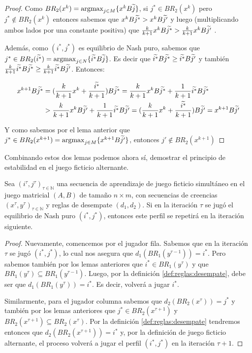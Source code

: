 \begin{proof}
    Como $BR_2(x^{k}) = \operatorname*{argmax}_{j \in M} \{x^k B \widetilde{j}\}$, si $j^* \in BR_2(x^k)$ pero $j^* \notin BR_2(x^k)$ entonces sabemos que $x^k B \widetilde{j^*} > x^k B \widetilde{j'}$ y luego (multiplicando ambos lados por una constante positiva) que $\frac{k}{k+1} x^k B \widetilde{j^*} > \frac{k}{k+1} x^k B \widetilde{j'}$ .

    Además, como $(i^*, j^*)$ es equilibrio de Nash puro, sabemos que $j^* \in BR_2(\widetilde{i^*}) = \operatorname*{argmax}_{j \in N} \{\widetilde{i^*}B\widetilde{j}\}$. Es decir que $\widetilde{i^*}B\widetilde{j^*} \ge \widetilde{i^*}B\widetilde{j'}$ y también $\frac{k}{k+1} \widetilde{i^*}B\widetilde{j^*} \ge \frac{k}{k+1} \widetilde{i^*}B\widetilde{j'}$. Entonces:

    \begin{align*}
        x^{k+1}B\widetilde{j^*} &= (\frac{k}{k+1} x^{k} + \frac{\widetilde{i^*}}{k+1})B\widetilde{j^*} = \frac{k}{k+1} x^{k}B\widetilde{j^*} + \frac{1}{k+1}\widetilde{i^*}B\widetilde{j^*} \\
        &> \frac{k}{k+1} x^{k}B\widetilde{j'} + \frac{1}{k+1}\widetilde{i^*}B\widetilde{j'} = (\frac{k}{k+1} x^{k} + \frac{\widetilde{i^*}}{k+1})B\widetilde{j'} = x^{k+1}B\widetilde{j'}
    \end{align*}

    Y como sabemos por el lema anterior que $j^* \in BR_2(x^{k+1}) = \operatorname*{argmax}_{j \in M} \{x^{k+1}B\widetilde{j'}\}$, entonces $j' \notin BR_2(x^{k+1})$

    
\end{proof}

Combinando estos dos lemas podemos ahora sí, demostrar el principio de estabilidad en el juego ficticio alternante.

\begin{theorem}
    Sea $(i^\tau, j^\tau)_{\tau \in \mathbb{N}}$ una secuencia de aprendizaje de juego ficticio simultáneo en el juego matricial $(A, B)$ de tamaño $n \times m$, con secuencias de creencias $(x^\tau, y^\tau)_{\tau \in \mathbb{N}}$ y reglas de desempate $(d_1, d_2)$. Si en la iteración $\tau$ se jugó el equilibrio de Nash puro $(i^*, j^*)$, entonces este perfil se repetirá en la iteración siguiente.
\end{theorem}

\begin{proof}
    Nuevamente, comencemos por el jugador fila. Sabemos que en la iteración $\tau$ se jugó $(i^*, j^*)$, lo cual nos asegura que $d_1(BR_1(y^{\tau-1})) = i^*$. Pero sabemos también por los lemas anteriores que $i^* \in BR_1(y^{\tau})$ y que $BR_1(y^{\tau}) \subseteq BR_1(y^{\tau-1})$. Luego, por la definición \ref{def:reglas:desempate}, debe ser que $d_1(BR_1(y^\tau)) = i^*$. Es decir, volverá a jugar $i^*$.

    Similarmente, para el jugador columna sabemos que $d_2(BR_2(x^{\tau})) = j^*$ y también por los lemas anteriores que $j^* \in BR_2(x^{\tau+1})$ y $BR_2(x^{\tau+1}) \subseteq BR_2(x^{\tau})$. Por la definición \ref{def:reglas:desempate} tendremos entonces que $d_2(BR_2(x^{\tau+1})) = i^*$ y, por la definición de juego ficticio alternante, el proceso volverá a jugar el perfil $(i^*, j^*)$ en la iteración $\tau+1$.
\end{proof}


